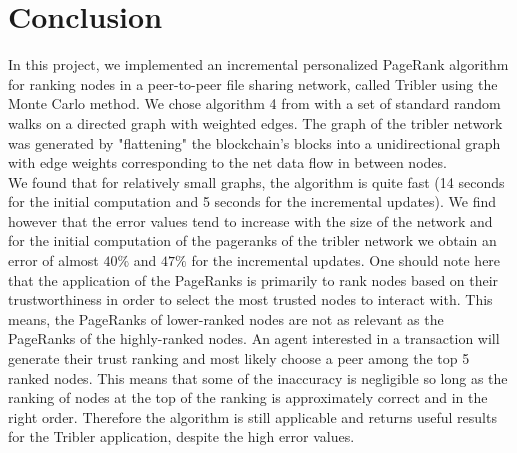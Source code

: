 \documentclass[sigconf]{acmart}
\theoremstyle{definition}
\begin{document}
\section{Conclusion}
\label{sec:Conclusion}
In this project, we implemented an incremental personalized PageRank algorithm for ranking nodes in a peer-to-peer file sharing network, called Tribler using the Monte Carlo method. We chose algorithm 4 from \citep{Monte Carlo methods in PageRank computation: When one iteration is sufficient} with a set of standard random walks on a directed graph with weighted edges. The graph of the tribler network was generated by "flattening" the blockchain's blocks into a unidirectional graph with edge weights corresponding to the net data flow in between nodes.\vspace{1em}\\

\noindent We found that for relatively small graphs, the algorithm is quite fast (14 seconds for the initial computation and 5 seconds for the incremental updates). We find however that the error values tend to increase with the size of the network and for the initial computation of the pageranks of the tribler network we obtain an error of almost $40\%$ and $47\%$ for the incremental updates. One should note here that the application of the PageRanks is primarily to rank nodes based on their trustworthiness in order to select the most trusted nodes to interact with. This means, the PageRanks of lower-ranked nodes are not as relevant as the PageRanks of the highly-ranked nodes. An agent interested in a transaction will generate their trust ranking and most likely choose a peer among the top 5 ranked nodes. This means that some of the inaccuracy is negligible so long as the ranking of nodes at the top of the ranking is approximately correct and in the right order. Therefore the algorithm is still applicable and returns useful results for the Tribler application, despite the high error values. \vspace{1em}\\
\end{document}
